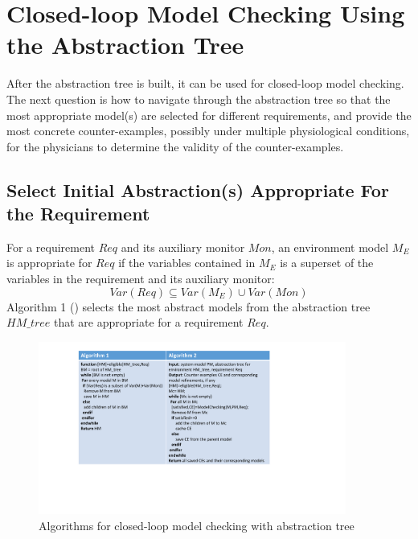 \section{Closed-loop Model Checking Using the Abstraction Tree}
After the abstraction tree is built, it can be used for closed-loop model checking. The next question is how to navigate through the abstraction tree so that the most appropriate model(s) are selected for different requirements, and provide the most concrete counter-examples, possibly under multiple physiological conditions, for the physicians to determine the validity of the counter-examples. %
\subsection{Select Initial Abstraction(s) Appropriate For the Requirement}
For a requirement $Req$ and its auxiliary monitor $Mon$, an environment model $M_E$ is appropriate for $Req$ if the variables contained in $M_E$ is a superset of the variables in the requirement and its auxiliary monitor: 
$$Var(Req)\subseteq Var(M_E)\cup Var(Mon)$$
Algorithm 1 () selects the most abstract models from the abstraction tree $HM\_tree$ that are appropriate for a requirement $Req$.
\begin{figure}[!t]
		\centering
		\includegraphics[width=0.9\textwidth]{figs/algorithm.pdf}
		\caption{\small Algorithms for closed-loop model checking with abstraction tree}
		\label{fig:algorithm}
\end{figure}
